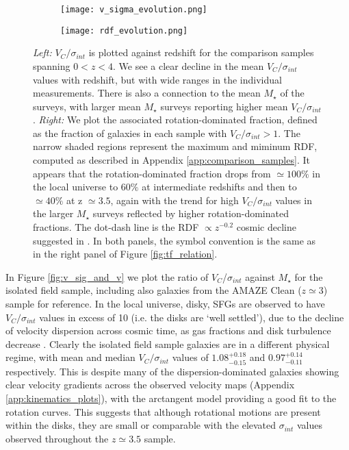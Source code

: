 \documentclass[fleqn,usenatbib]{mnras}
\begin{document}
\begin{figure*}
    \centering \hspace{-1.3cm}
    \begin{subfigure}[h!]{0.5\textwidth}
        \centering
        \texttt{[image: v\_sigma\_evolution.png]}
    \end{subfigure} \hspace{+0.4cm}
    \begin{subfigure}[h!]{0.5\textwidth}
        \centering
        \texttt{[image: rdf\_evolution.png]}
    \end{subfigure}
    \caption{{\it Left:} $V_{C}/\sigma_{int}$ is plotted against redshift for the comparison samples spanning $0 < z < 4$.
    We see a clear decline in the mean $V_{C}/\sigma_{int}$ values with redshift, but with wide ranges in the individual measurements.
    There is also a connection to the mean $M_{\star}$ of the surveys, with larger mean $M_{\star}$ surveys reporting higher mean $V_{C}/\sigma_{int}$.
    {\it Right:} We plot the associated rotation-dominated fraction, defined as the fraction of galaxies in each sample with $V_{C}/\sigma_{int} > 1$.
    The narrow shaded regions represent the maximum and miminum RDF, computed as described in Appendix \protect\ref{app:comparison_samples}.
    It appears that the rotation-dominated fraction drops from $\simeq100\%$ in the local universe to $60\%$ at intermediate redshifts and then to $\simeq40\%$ at z $\simeq3.5$, again with the trend for high $V_{C}/\sigma_{int}$ values in the larger $M_{\star}$ surveys reflected by higher rotation-dominated fractions.
    The dot-dash line is the RDF $\propto z^{-0.2}$ cosmic decline suggested in \protect\cite{Stott2016}.
    In both panels, the symbol convention is the same as in the right panel of Figure \protect\ref{fig:tf_relation}.
}
    \label{fig:rdf_and_v_sigma_w_redshift}
\end{figure*}

In Figure \ref{fig:v_sig_and_v} we plot the ratio of $V_{C}$/$\sigma_{int}$ against $M_{\star}$ for the isolated field sample, including also galaxies from the AMAZE Clean ($z\simeq3$) sample for reference.
In the local universe, disky, SFGs are observed to have $V_{C}/\sigma_{int}$ values in excess of 10 (i.e. the disks are `well settled'), due to the decline of velocity dispersion across cosmic time, as gas fractions and disk turbulence decrease \citep[e.g.][]{Epinat2008,Epinat2008a}.
Clearly the isolated field sample galaxies are in a different physical regime, with mean and median $V_{C}/\sigma_{int}$ values of $1.08^{+0.18}_{-0.15}$ and $0.97^{+0.14}_{-0.11}$ respectively.
This is despite many of the dispersion-dominated galaxies showing clear velocity gradients across the observed velocity maps (Appendix \ref{app:kinematics_plots}), with the arctangent model providing a good fit to the rotation curves.
This suggests that although rotational motions are present within the disks, they are small or comparable with the elevated $\sigma_{int}$ values observed throughout the $z\simeq3.5$ sample. \\
\end{document}
